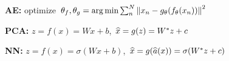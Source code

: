 \textbf{AE:} optimize $\theta_f, \theta_g = \operatorname*{arg\,min} \sum_n^N \left\lVert x_n - g_\theta(f_\theta(x_n)) \right\rVert ^2$\\

\textbf{PCA:} $z = f(x) = Wx + b$, $\widehat{x} = g(z) = W^* z + c$\\

\textbf{NN:} $z = f(x) = \sigma(Wx + b)$, $\widehat{x} = g(\widehat{a} (x)) = \sigma(W^*z + c)$\\

